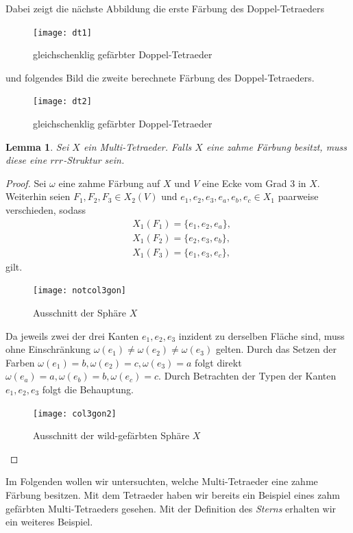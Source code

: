\documentclass[12pt,titlepage,twoside,cleardoublepage]{article}
\theoremstyle{nummermitklammern}
\newtheorem{lemma}[temp]{Lemma}
\newtheorem{lemma}[zahl]{Lemma}
\numberwithin{equation}{section}
\begin{document}
Dabei zeigt die nächste Abbildung die erste Färbung des Doppel-Tetraeders 
\begin{figure}[H]
\begin{center}
\texttt{[image: dt1]}
\end{center}
\caption{gleichschenklig gefärbter Doppel-Tetraeder}
\end{figure}
und folgendes Bild die zweite berechnete Färbung des Doppel-Tetraeders.
\begin{figure}[H]
\begin{center}
\texttt{[image: dt2]}
\end{center}
\caption{gleichschenklig gefärbter Doppel-Tetraeder}
\end{figure}
\begin{lemma}
Sei $X$ ein Multi-Tetraeder. Falls $X$ eine zahme Färbung besitzt, muss diese eine $rrr$-Struktur sein.
\end{lemma}
\begin{proof}
Sei $\omega$ eine zahme Färbung auf $X$ und $V$ eine Ecke vom Grad 3 in $X.$ Weiterhin seien $F_1,F_2,F_3\in X_2(V)$ und $e_1,e_2,e_3,e_a,e_b,e_c\in X_1$ paarweise verschieden, sodass 
\begin{align*}
&X_1(F_1)=\{e_1,e_2,e_a\},\\
&X_1(F_2)=\{e_2,e_3,e_b\}, \\
&X_1(F_3)=\{e_1,e_3,e_c\},
\end{align*}
gilt.
\begin{figure}[H]
\begin{center}
\texttt{[image: notcol3gon]}
\end{center}
\caption{Ausschnitt der Sphäre $X$}
\end{figure}
Da jeweils zwei der drei Kanten $e_1,e_2,e_3$ inzident zu derselben Fläche sind, muss ohne Einschränkung $\omega(e_1)\neq\omega(e_2)\neq\omega(e_3)$ gelten. Durch das Setzen der Farben $\omega(e_1)=b,\omega(e_2)=c,\omega(e_3)=a$ folgt direkt $\omega(e_a)=a,\omega(e_b)=b,\omega(e_c)=c.$  Durch Betrachten der Typen der Kanten $e_1,e_2,e_3$ folgt die Behauptung.
\begin{figure}[H]
\begin{center}
\texttt{[image: col3gon2]}
\end{center}
\caption{Ausschnitt der wild-gefärbten Sphäre $X$}
\end{figure}
\end{proof}
Im Folgenden wollen wir untersuchten, welche Multi-Tetraeder eine zahme Färbung besitzen. Mit dem Tetraeder haben wir bereits ein Beispiel eines zahm gefärbten Multi-Tetraeders gesehen. Mit der Definition des \emph{Sterns} erhalten wir ein weiteres Beispiel.
\end{document}
